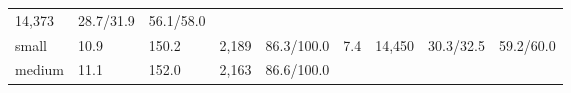 \documentclass[
  9pt, a4paper, landscape]{article}
\begin{document}
\begin{longtable}[]{@{}lllllllll@{}}
\begin{minipage}[t]{0.08\columnwidth}
14,373\strut
\end{minipage} & \begin{minipage}[t]{0.08\columnwidth}\raggedright
28.7/31.9\strut
\end{minipage} & \begin{minipage}[t]{0.08\columnwidth}\raggedright
56.1/58.0\strut
\end{minipage}\tabularnewline
\begin{minipage}[t]{0.08\columnwidth}\raggedright
small\strut
\end{minipage} & \begin{minipage}[t]{0.08\columnwidth}\raggedright
10.9\strut
\end{minipage} & \begin{minipage}[t]{0.08\columnwidth}\raggedright
150.2\strut
\end{minipage} & \begin{minipage}[t]{0.08\columnwidth}\raggedright
2,189\strut
\end{minipage} & \begin{minipage}[t]{0.08\columnwidth}\raggedright
86.3/100.0\strut
\end{minipage} & \begin{minipage}[t]{0.08\columnwidth}\raggedright
7.4\strut
\end{minipage} & \begin{minipage}[t]{0.08\columnwidth}\raggedright
14,450\strut
\end{minipage} & \begin{minipage}[t]{0.08\columnwidth}\raggedright
30.3/32.5\strut
\end{minipage} & \begin{minipage}[t]{0.08\columnwidth}\raggedright
59.2/60.0\strut
\end{minipage}\tabularnewline
\begin{minipage}[t]{0.08\columnwidth}\raggedright
medium\strut
\end{minipage} & \begin{minipage}[t]{0.08\columnwidth}\raggedright
11.1\strut
\end{minipage} & \begin{minipage}[t]{0.08\columnwidth}\raggedright
152.0\strut
\end{minipage} & \begin{minipage}[t]{0.08\columnwidth}\raggedright
2,163\strut
\end{minipage} & \begin{minipage}[t]{0.08\columnwidth}\raggedright
86.6/100.0\strut

\end{minipage}
\end{longtable}
\end{document}
